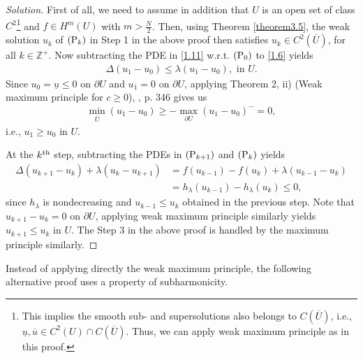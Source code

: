 \documentclass[11pt,a4paper,center,notitlepage]{article}
\numberwithin{equation}{section}
\begin{document}
\begin{proof}[Solution]
First of all, we need to assume in addition that $U$ is an open set of class $C^2$\footnote{This implies the smooth sub- and supersolutions also belongs to $C\left(\overline{U}\right)$, i.e., $\underline u ,\overline u  \in {C^2}\left( U \right) \cap C\left( {\overline U } \right)$. Thus, we can apply weak maximum principle as in this proof.} and $f\in H^m\left(U\right)$ with $m>\frac{N}{2}$. Then, using Theorem \ref{theorem3.5}, the weak solution $u_k$ of $\left({\rm P}_k\right)$ in Step 1 in the above proof then satisfies $u_k\in C^2\left(\overline{U}\right)$, for all $k\in \mathbb{Z}^+$. Now subtracting the PDE in \eqref{1.11} w.r.t. $\left({\rm P}_0\right)$ to \eqref{1.6} yields
\begin{align}
\label{2.3}
\Delta \left( {{u_1} - {u_0}} \right) \le \lambda \left( {{u_1} - {u_0}} \right),\mbox{ in } U.
\end{align}
Since $u_0=\underline{u} \le 0$ on $\partial U$ and $u_1 = 0$ on $\partial U$, applying Theorem 2, ii) (Weak maximum principle for $c\ge 0$), \cite{1}, p. 346 gives us
\begin{align}
\mathop {\min }\limits_{\overline U } \left( {{u_1} - {u_0}} \right) \ge  - \mathop {\max }\limits_{\partial U} {\left( {{u_1} - {u_0}} \right)^ - } = 0,
\end{align}
i.e., $u_1\ge u_0$ in $U$. 

At the $k^{\rm th}$ step, subtracting the PDEs in $\left({\rm P}_{k+1}\right)$ and $\left({\rm P}_k\right)$ yields
\begin{align}
\Delta \left( {{u_{k + 1}} - {u_k}} \right) + \lambda \left( {{u_k} - {u_{k + 1}}} \right) &= f\left( {{u_{k - 1}}} \right) - f\left( {{u_k}} \right) + \lambda \left( {{u_{k - 1}} - {u_k}} \right)\\
 &= {h_\lambda }\left( {{u_{k - 1}}} \right) - {h_\lambda }\left( {{u_k}} \right) \le 0,
\end{align}
since $h_\lambda$ is nondecreasing and $u_{k-1}\le u_k$ obtained in the previous step. Note that $u_{k+1}-u_k =0$ on $\partial U$, applying weak maximum principle similarly yields $u_{k+1}\le u_k$ in $U$. The Step 3 in the above proof is handled by the maximum principle similarly.
\end{proof}
Instead of applying directly the weak maximum principle, the following alternative proof uses a property of subharmonicity.
\end{document}

